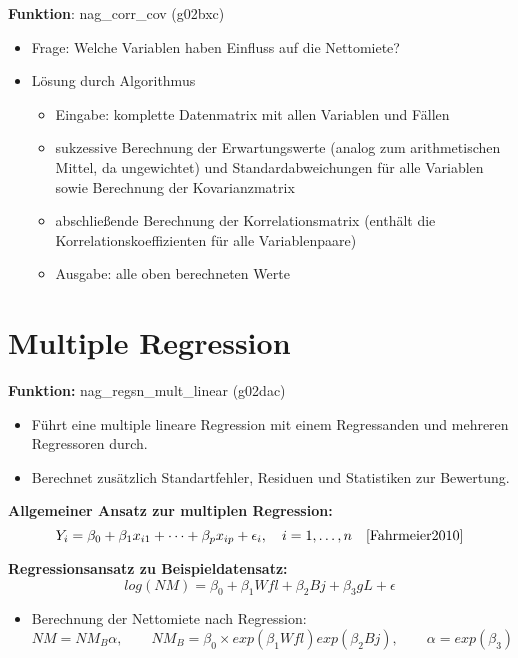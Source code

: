 \documentclass[a4paper]{article}
\begin{document}
{\bf Funktion}: nag\_corr\_cov (g02bxc)\cite{nag:intro}
\begin{itemize}
	\item Frage: Welche Variablen haben Einfluss auf die Nettomiete?
	\item Lösung durch Algorithmus
		\begin{itemize}
			\item Eingabe: komplette Datenmatrix mit allen Variablen und Fällen
			\item sukzessive Berechnung der Erwartungswerte (analog zum arithmetischen Mittel, da ungewichtet) und Standardabweichungen für alle Variablen sowie Berechnung der Kovarianzmatrix
			\item abschließende Berechnung der Korrelationsmatrix (enthält die Korrelationskoeffizienten für alle Variablenpaare)
			\item Ausgabe: alle oben berechneten Werte
		\end{itemize}
	\end{itemize}

\section*{Multiple Regression}

{\bf Funktion:} nag\_regsn\_mult\_linear (g02dac)\cite{nag:intro}
\begin{itemize}
\item Führt eine multiple lineare Regression mit einem Regressanden und mehreren Regressoren durch.
\item Berechnet zusätzlich Standartfehler, Residuen und Statistiken zur Bewertung.
\end{itemize}

{\bf Allgemeiner Ansatz zur multiplen Regression:}
\begin{equation*}
  Y_i = \beta_0 + \beta_1 x_{i1} + \dots + \beta_p x_{ip} + \epsilon_i, \quad i = 1, \dots, n \quad \cite{Fahrmeier2010}
\end{equation*}

{\bf Regressionsansatz zu Beispieldatensatz:}
\begin{equation*}
  log(NM) = \beta_0 + \beta_1 Wfl + \beta_2 Bj + \beta_3 gL + \epsilon
\end{equation*}
\begin{itemize}
\item Berechnung der Nettomiete nach Regression:
  \begin{equation*}
    NM = NM_B \alpha,\qquad
    NM_B = \beta_0 \times exp(\beta_1 Wfl) exp(\beta_2 Bj),\qquad
    \alpha = exp(\beta_3)
  \end{equation*}
\end{itemize}
\end{document}
